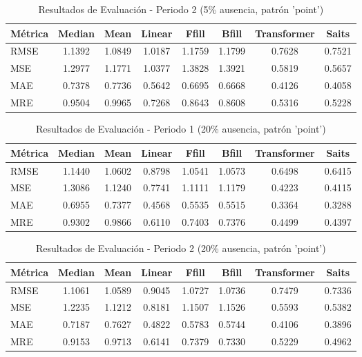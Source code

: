 \begin{table}[htbp]
\centering
\caption{Resultados de Evaluación - Periodo 2 (5\% ausencia, patrón 'point')}
\label{tab:poqueira_5_point_per2}
\begin{tabular}{l*{7}{S[table-format=1.4]}}
\toprule
\textbf{Métrica} & \textbf{Median} & \textbf{Mean} & \textbf{Linear} & \textbf{Ffill} & \textbf{Bfill} & \textbf{Transformer} & \textbf{Saits} \\
\midrule
RMSE & 1.1392 & 1.0849 & 1.0187 & 1.1759 & 1.1799 & 0.7628 & 0.7521 \\
MSE  & 1.2977 & 1.1771 & 1.0377 & 1.3828 & 1.3921 & 0.5819 & 0.5657 \\
MAE  & 0.7378 & 0.7736 & 0.5642 & 0.6695 & 0.6668 & 0.4126 & 0.4058 \\
MRE  & 0.9504 & 0.9965 & 0.7268 & 0.8643 & 0.8608 & 0.5316 & 0.5228 \\
\bottomrule
\end{tabular}
\end{table}

\begin{table}[htbp]
\centering
\caption{Resultados de Evaluación - Periodo 1 (20\% ausencia, patrón 'point')}
\label{tab:poqueira_20_point_per1}
\begin{tabular}{l*{7}{S[table-format=1.4]}}
\toprule
\textbf{Métrica} & \textbf{Median} & \textbf{Mean} & \textbf{Linear} & \textbf{Ffill} & \textbf{Bfill} & \textbf{Transformer} & \textbf{Saits} \\
\midrule
RMSE & 1.1440 & 1.0602 & 0.8798 & 1.0541 & 1.0573 & 0.6498 & 0.6415 \\
MSE  & 1.3086 & 1.1240 & 0.7741 & 1.1111 & 1.1179 & 0.4223 & 0.4115 \\
MAE  & 0.6955 & 0.7377 & 0.4568 & 0.5535 & 0.5515 & 0.3364 & 0.3288 \\
MRE  & 0.9302 & 0.9866 & 0.6110 & 0.7403 & 0.7376 & 0.4499 & 0.4397 \\
\bottomrule
\end{tabular}
\end{table}

\begin{table}[htbp]
\centering
\caption{Resultados de Evaluación - Periodo 2 (20\% ausencia, patrón 'point')}
\label{tab:poqueira_20_point_per2}
\begin{tabular}{l*{7}{S[table-format=1.4]}}
\toprule
\textbf{Métrica} & \textbf{Median} & \textbf{Mean} & \textbf{Linear} & \textbf{Ffill} & \textbf{Bfill} & \textbf{Transformer} & \textbf{Saits} \\
\midrule
RMSE & 1.1061 & 1.0589 & 0.9045 & 1.0727 & 1.0736 & 0.7479 & 0.7336 \\
MSE  & 1.2235 & 1.1212 & 0.8181 & 1.1507 & 1.1526 & 0.5593 & 0.5382 \\
MAE  & 0.7187 & 0.7627 & 0.4822 & 0.5783 & 0.5744 & 0.4106 & 0.3896 \\
MRE  & 0.9153 & 0.9713 & 0.6141 & 0.7379 & 0.7330 & 0.5229 & 0.4962 \\
\bottomrule
\end{tabular}
\end{table}

